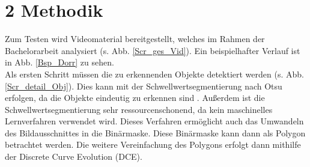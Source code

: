\documentclass[a4paper,11pt,pdftex, parskip]{scrreprt}
\begin{document}
\section*{2 Methodik}{
Zum Testen wird Videomaterial bereitgestellt, welches im Rahmen der Bachelorarbeit analysiert (s. Abb. \ref{Scr_ges_Vid}). Ein beispielhafter Verlauf ist in Abb. \ref{Bsp_Dorr} zu sehen. \\
Als ersten Schritt müssen die zu erkennenden Objekte detektiert werden (s. Abb. \ref{Scr_detail_Obj}). Dies kann mit der Schwellwertsegmentierung nach Otsu erfolgen, da die Objekte eindeutig zu erkennen sind \citep{Otsu1979}. Außerdem ist die Schwellwertsegmentierung sehr ressourcenschonend, da kein maschinelles Lernverfahren verwendet wird. Dieses Verfahren ermöglicht auch das Umwandeln des Bildausschnittes in die Binärmaske. Diese Binärmaske kann dann als Polygon betrachtet werden.
Die weitere Vereinfachung des Polygons erfolgt dann mithilfe der Discrete Curve Evolution (DCE).
%     
    

}
\end{document}
